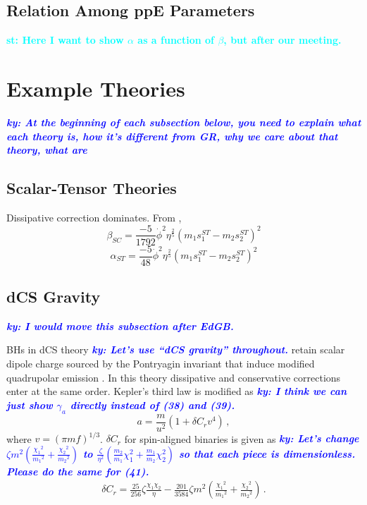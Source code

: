 \documentclass[11pt]{article}
\newcommand{\ky}[1]{\textcolor{blue}{\it{\textbf{ky: #1}}} }
\newcommand{\st}[1]{\textcolor{cyan}{\textbf{st: #1}} }
\begin{document}
\subsection{Relation Among ppE Parameters}
\st{Here I want to show $\alpha$ as a function of $\beta$, but after our meeting.}





 \section{Example Theories}
 \vspace*{20pt}

\ky{At the beginning of each subsection below, you need to explain what each theory is, how it's different from GR, why we care about that theory, what are }

 \subsection{Scalar-Tensor Theories}
 Dissipative correction dominates.  From \cite{Yunes:2016jcc},
 \begin{equation}
 \beta_{SC}=\frac{-5}{1792}\dot{\phi}^2\eta^{\frac{2}{5}}(m_1s_1^{ST}-m_2s_2^{ST})^2
 \end{equation}
 \begin{equation}
 \alpha_{ST}=\frac{-5}{48}\dot{\phi}^2\eta^{\frac{2}{5}}(m_1s_1^{ST}-m_2s_2^{ST})^2
 \end{equation}
 
 \subsection{dCS Gravity}
 
 \ky{I would move this subsection after EdGB.}
 
\hspace{15.5pt}BHs in dCS theory \ky{Let's use ``dCS gravity'' throughout.} retain scalar dipole charge sourced by the Pontryagin invariant that induce modified quadrupolar emission \cite{Yagi:2011xp,Yunes:2016jcc}. In this theory dissipative and conservative corrections enter at the same order. Kepler's third law is modified as \cite{Yagi:2012vf} \ky{I think we can just show $\gamma_a$ directly instead of (38) and (39).}
 \begin{equation}\label{eq:3.3a}
 a=\frac{m}{u^2}(1+\delta C_r v^4)\,,
 \end{equation}
where $v=(\pi m f)^{1/3}$. $\delta C_r$ for  spin-aligned binaries is given as  \ky{Let's change $\zeta m^2 \left(\frac{{\chi_1}^2}{{m_1}^2}+\frac{{\chi_2}^2}{{m_2}^2}\right)$ to $\frac{\zeta}{\eta^2}\left(\frac{m_2}{m_1}\chi_1^2+\frac{m_1}{m_2}\chi_2^2\right)$ so that each piece is dimensionless. Please do the same for (41).}
\begin{align}
\delta C_r=\frac{25}{256}\zeta \frac{\chi_1 \chi_2}{\eta}-\frac{201}{3584}\zeta m^2\left(\frac{{\chi_1}^2}{{m_1}^2}+\frac{{\chi_2}^2}{{m_2}^2}\right)\,.
\end{align} 
\end{document}
